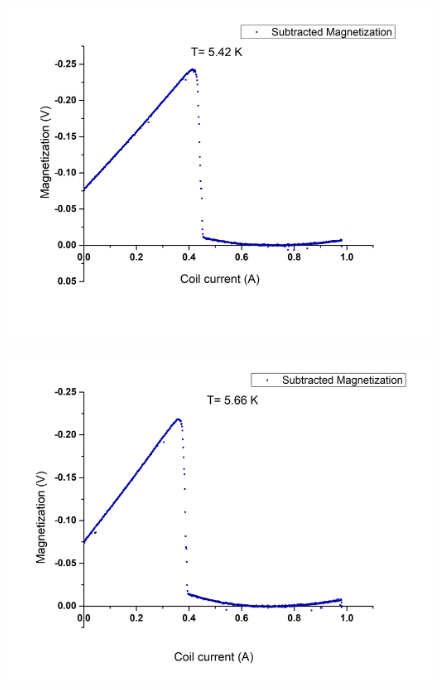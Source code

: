 \documentclass[openany,11pt,a4paper]{report}
\begin{document}
\begin{figure}[H]
\begin{center}
\includegraphics[scale=0.5]{542.jpg}
\end{center}
\end{figure}

\begin{figure}[H]
\begin{center}
\includegraphics[scale=0.5]{566.jpg}
\end{center}
\end{figure}
\end{document}
